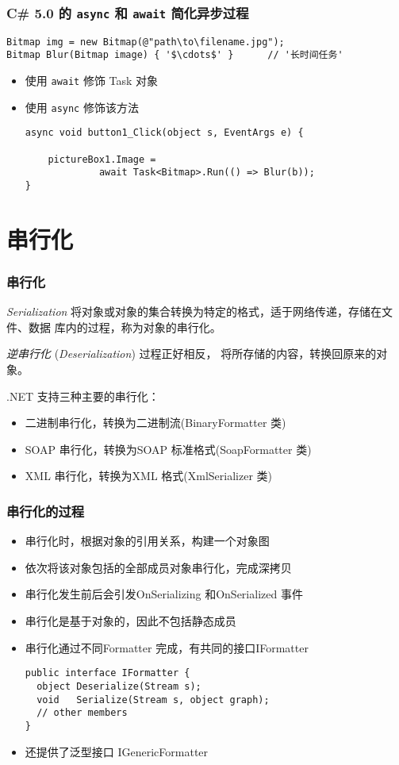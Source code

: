 \begin{frame}[fragile,t]
\frametitle{C\# 5.0 的 \texttt{async} 和 \texttt{await} 简化异步过程}
\begin{lstlisting}[escapeinside='']
Bitmap img = new Bitmap(@"path\to\filename.jpg");
Bitmap Blur(Bitmap image) { '$\cdots$' }      // '长时间任务'
\end{lstlisting}
\begin{itemize}
\item 使用 \texttt{await} 修饰 Task 对象
\item 使用 \texttt{async} 修饰该方法
\begin{lstlisting}
async void button1_Click(object s, EventArgs e) {

    pictureBox1.Image = 
             await Task<Bitmap>.Run(() => Blur(b));
}
\end{lstlisting}
\end{itemize}
\end{frame}


\section{串行化}

\begin{frame}
\frametitle{串行化}
\begin{block}{\textit{Serialization}}
\CJKindent 将对象或对象的集合转换为特定的格式，适于网络传递，存储在文件、数据
库内的过程，称为对象的串行化。

{\em 逆串行化} (\textit{Deserialization}) 过程正好相反，
将所存储的内容，转换回原来的对象。
\end{block}
.NET 支持三种主要的串行化：
\begin{itemize}
\item 二进制串行化，转换为二进制流(BinaryFormatter 类)
\item SOAP 串行化，转换为SOAP 标准格式(SoapFormatter 类)
\item XML 串行化，转换为XML 格式(XmlSerializer 类)
\end{itemize}
\end{frame}

\begin{frame}[fragile]
\frametitle{串行化的过程}
\begin{itemize}
\item 串行化时，根据对象的引用关系，构建一个对象图
\item 依次将该对象包括的全部成员对象串行化，完成深拷贝
\item 串行化发生前后会引发OnSerializing 和OnSerialized 事件
\item 串行化是基于对象的，因此不包括静态成员
\medskip \pause
\item 串行化通过不同Formatter 完成，有共同的接口IFormatter
\begin{lstlisting}
public interface IFormatter {
  object Deserialize(Stream s);
  void   Serialize(Stream s, object graph);
  // other members
}
\end{lstlisting}
\item 还提供了泛型接口 IGenericFormatter
\end{itemize}
\end{frame}

